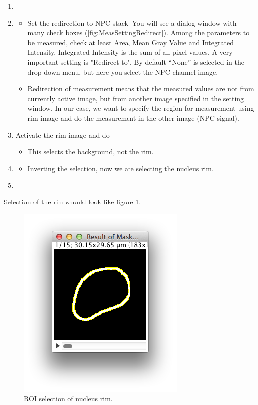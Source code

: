 \begin{enumerate}
  \item {}
  \item {}
  \begin{itemize}
    \item Set the redirection to NPC stack. You will see a dialog window with many check boxes (\ref{fig:MeasSettingRedirect}). Among the parameters to be measured, check at least Area, Mean Gray Value and Integrated Intensity. Integrated Intensity is the sum of all pixel values. A very important setting is "Redirect to". By default ``None'' is selected in the drop-down menu, but here you select the NPC channel image.
    \item Redirection of measurement means that the measured values are not from currently active image, but from another image specified in the setting window. In our case, we want to specify the region for measurement using rim image and do the measurement in the other image (NPC signal). 
  \end{itemize}
  \item Activate the rim image and do 
  \begin{itemize}
    \item This selects the background, not the rim. 
  \end{itemize}
  \item {}
  \begin{itemize}
    \item Inverting the selection, now we are selecting the nucleus rim. 
  \end{itemize}
  \item {}
\end{enumerate}

Selection of the rim should look like figure \ref{fig_RoiNucRim}.

\begin{figure}[h!]
\begin{center}
\includegraphics[scale=0.8]{fig/ROIselectionNucRim.png}
\caption{ROI selection of nucleus rim. }
\label{fig_RoiNucRim}
\end{center}
\end{figure}

